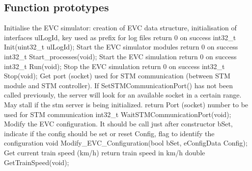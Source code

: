 \documentclass{template/openetcs_article}
\begin{document}
\subsection{Function prototypes}
Initialise the EVC simulator: creation of EVC data structure, initialisation of interfaces
\newline [in] ulLogId, key used as prefix for log files
\newline return 0 on success
\newline int32\_t Init(uint32\_t ulLogId);
\newline
\newline Start the EVC simulator modules
\newline return 0 on success
\newline int32\_t Start\_processes(void);
\newline
\newline Start the EVC simulation
\newline return 0 on success
\newline int32\_t Run(void);
\newline
\newline Stop the EVC simulation
\newline return 0 on success
\newline int32\_t Stop(void);
\newline
\newline Get port (socket) used for STM communication (between STM module and STM controller).
If SetSTMCommunicationPort() has not been called previously, the server will look for an available socket in a certain range. May stall if the stm server is being initialized.
\newline return Port (socket) number to be used for STM communication
\newline int32\_t WaitSTMCommunicationPort(void);
\newline
\newline Modify the EVC configuration. It should be call just after constructor
\newline [in] bSet, indicate if the config should be set or reset
\newline [in] Config, flag to identify the configuration
\newline void Modify\_EVC\_Configuration(bool bSet, eConfigData Config);
\newline
\newline Get current train speed (km/h)
\newline return train speed in km/h
\newline double GetTrainSpeed(void);
\end{document}
